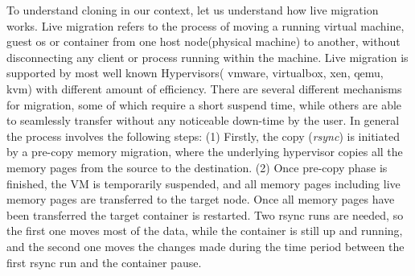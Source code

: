 To understand cloning in our context, let us understand how live migration works. 
Live migration refers to the process of moving a running virtual machine, guest os or container from one host node(physical machine) to another, without disconnecting any client or process running within the machine. 
Live migration is supported by most well known Hypervisors( vmware, virtualbox, xen, qemu, kvm) with different amount of efficiency.
There are several different mechanisms for migration, some of which require a short suspend time, while others are able to seamlessly transfer without any noticeable down-time by the user.
In general the process involves the following steps: 
(1) Firstly, the copy (\textit{rsync}) is initiated by a pre-copy memory migration, where the underlying hypervisor copies all the memory pages from the source to the destination. 
(2) Once pre-copy phase is finished, the VM is temporarily suspended, and all memory pages including live memory pages are transferred to the target node. 
Once all memory pages have been transferred the target container is restarted. 
Two rsync runs are needed, so the first one moves most of the data, while the container is still up and running, and the second one moves the changes made during the time period between the first rsync run and the container pause.

